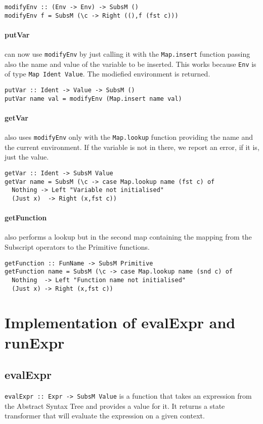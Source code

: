 \documentclass{article}
\begin{document}
\begin{lstlisting}
modifyEnv :: (Env -> Env) -> SubsM ()
modifyEnv f = SubsM (\c -> Right ((),f (fst c)))
\end{lstlisting}


\paragraph{putVar} can now use \texttt{modifyEnv} by just calling it with the \texttt{Map.insert} function passing also the name and value
of the variable to be inserted. This works because \texttt{Env} is of type \texttt{Map Ident Value}. The modiefied environment is returned.

\begin{lstlisting}
putVar :: Ident -> Value -> SubsM ()
putVar name val = modifyEnv (Map.insert name val)
\end{lstlisting}

\paragraph{getVar} also uses \texttt{modifyEnv} only with the \texttt{Map.lookup} function providing the name and the current environment. 
If the variable is not in there, we report an error, if it is, just the value.

\begin{lstlisting}
getVar :: Ident -> SubsM Value
getVar name = SubsM (\c -> case Map.lookup name (fst c) of
  Nothing -> Left "Variable not initialised"
  (Just x)  -> Right (x,fst c))
\end{lstlisting}

\paragraph{getFunction} also performs a lookup but in the second map containing the mapping from the Subscript operators to the Primitive functions.
\begin{lstlisting}
getFunction :: FunName -> SubsM Primitive
getFunction name = SubsM (\c -> case Map.lookup name (snd c) of
  Nothing  -> Left "Function name not initialised"
  (Just x) -> Right (x,fst c))
\end{lstlisting}


\section{Implementation of evalExpr and runExpr}
\subsection{evalExpr}
\texttt{evalExpr :: Expr -> SubsM Value} is a function that takes an expression from the Abstract Syntax Tree and provides a value for it. It returns a state transformer that will evaluate the expression on a given context. 
\end{document}
